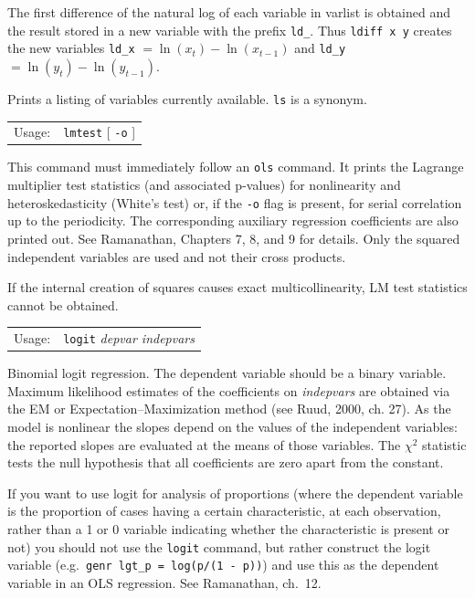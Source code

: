 \documentclass{article}
\begin{document}
{The first difference of the natural log of each variable in varlist
is obtained and the result stored in a new variable with the
prefix \texttt{ld\_}.  Thus \texttt{ldiff x y} creates the new
variables \texttt{ld\_x} $= \ln(x_t) - \ln(x_{t-1})$ and \texttt{ld\_y} 
$= \ln(y_t) - \ln(y_{t-1})$.


Prints a listing of variables currently available.  \texttt{ls} is a
synonym.  


\begin{tabular}{ll}
Usage:  & \texttt{lmtest} [ \texttt{-o} ]  
\end{tabular}

This command must immediately follow an \texttt{ols} command.  It
prints the Lagrange multiplier test statistics (and associated
p-values) for nonlinearity and heteroskedasticity (White's test) or,
if the \texttt{-o} flag is present, for serial correlation up to the
periodicity.  The corresponding auxiliary regression coefficients are
also printed out.  See Ramanathan, Chapters 7, 8, and 9 for details.
Only the squared independent variables are used and not their cross
products.

If the internal creation of squares causes exact multicollinearity, LM
test statistics cannot be obtained.


\begin{tabular}{ll}
Usage:   &    \texttt{logit} \textit{depvar indepvars}
\end{tabular}

Binomial logit regression. The dependent variable should be a binary
variable.  Maximum likelihood estimates of the coefficients on
\textit{indepvars} are obtained via the EM or
Expectation--Maximization method (see Ruud, 2000, ch. 27).  As the
model is nonlinear the slopes depend on the values of the independent
variables: the reported slopes are evaluated at the means of those
variables.  The $\chi^2$ statistic tests the null hypothesis that all
coefficients are zero apart from the constant.

If you want to use logit for analysis of proportions (where the
dependent variable is the proportion of cases having a certain
characteristic, at each observation, rather than a 1 or 0 variable
indicating whether the characteristic is present or not) you should
not use the \texttt{logit} command, but rather construct the logit
variable (e.g.\ \texttt{genr lgt\_p = log(p/(1 - p))}) and use this as
the dependent variable in an OLS regression.  See Ramanathan, ch.\ 12.

}
\end{document}
